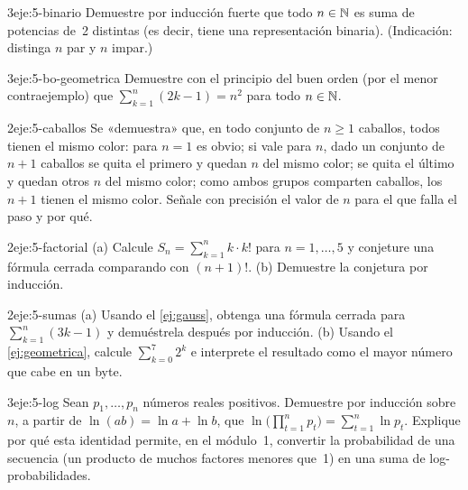 \begin{ejercicio}{3}{eje:5-binario}
Demuestre por inducción fuerte que todo $n\in\mathbb{N}$ es suma de potencias de~2 distintas (es decir, tiene una representación binaria). (Indicación: distinga $n$ par y $n$ impar.)
\end{ejercicio}

\begin{ejercicio}{3}{eje:5-bo-geometrica}
Demuestre con el principio del buen orden (por el menor contraejemplo) que $\sum_{k=1}^{n}(2k-1)=n^{2}$ para todo $n\in\mathbb{N}$.
\end{ejercicio}

\begin{ejercicio}{2}{eje:5-caballos}
Se «demuestra» que, en todo conjunto de $n\ge 1$ caballos, todos tienen el mismo color: para $n=1$ es obvio; si vale para $n$, dado un conjunto de $n+1$ caballos se quita el primero y quedan $n$ del mismo color; se quita el último y quedan otros $n$ del mismo color; como ambos grupos comparten caballos, los $n+1$ tienen el mismo color. Señale con precisión el valor de $n$ para el que falla el paso y por qué.
\end{ejercicio}

\begin{ejercicio}{2}{eje:5-factorial}
(a) Calcule $S_n=\sum_{k=1}^{n}k\cdot k!$ para $n=1,\dots,5$ y conjeture una fórmula cerrada comparando con $(n+1)!$. (b) Demuestre la conjetura por inducción.
\end{ejercicio}

\begin{ejercicio}{2}{eje:5-sumas}
(a) Usando el \cref{ej:gauss}, obtenga una fórmula cerrada para $\sum_{k=1}^{n}(3k-1)$ y demuéstrela después por inducción. (b) Usando el \cref{ej:geometrica}, calcule $\sum_{k=0}^{7}2^{k}$ e interprete el resultado como el mayor número que cabe en un byte.
\end{ejercicio}

\begin{ejercicio}{3}{eje:5-log}
Sean $p_1,\dots,p_n$ números reales positivos. Demuestre por inducción sobre $n$, a partir de $\ln(ab)=\ln a+\ln b$, que $\ln\bigl(\prod_{t=1}^{n}p_t\bigr)=\sum_{t=1}^{n}\ln p_t$. Explique por qué esta identidad permite, en el módulo~1, convertir la probabilidad de una secuencia (un producto de muchos factores menores que~1) en una suma de log-probabilidades.
\end{ejercicio}
